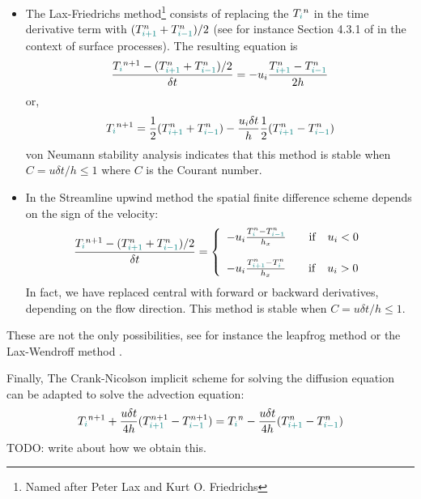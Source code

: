\begin{itemize}
\item The {\color{olive} Lax-Friedrichs method}\footnote{Named after Peter Lax 
and Kurt O. Friedrichs} consists of replacing the $T_{\color{teal}i}^n$ 
in the time derivative term with $(T_{{\color{teal}i+1}}^n + T_{{\color{teal}i-1}}^n)/2$
(see for instance Section 4.3.1 of \cite{pell08} in the context of surface processes). 
The resulting equation is
\[
\frac{T_{\color{teal}i}^{n+1}-  (T_{{\color{teal}i+1}}^n + T_{{\color{teal}i-1}}^n)/2 }{\delta t} 
= - u_i \frac{T^n_{{\color{teal}i+1}}-T^n_{{\color{teal}i-1}}}{2 h}
\]
or, 
\[
T_{\color{teal}i}^{n+1} = \frac{1}{2} (T_{{\color{teal}i+1}}^n + T_{{\color{teal}i-1}}^n)  
- \frac{u_i \delta t}{h}  \frac{1}{2} (T^n_{{\color{teal}i+1}}-T^n_{{\color{teal}i-1}})
\]
von Neumann stability analysis indicates that this method is stable
when $C=u \delta t/h \leq 1$ where $C$ is the Courant number.
\item In the {\color{olive}Streamline upwind} method the spatial finite difference scheme 
depends on the sign of the velocity:
\[
\frac{T_{\color{teal}i}^{n+1}-  (T_{{\color{teal}i+1}}^n + T_{{\color{teal}i-1}}^n)/2   }{\delta t} =
\left\{
\begin{array}{l}
 - u_i \frac{T^n_{{\color{teal}i}}-T^n_{{\color{teal}i-1}}}{h_x}  \quad\quad  {\rm if} \quad u_i<0\\ \\
 - u_i \frac{T^n_{{\color{teal}i+1}}-T^n_{{\color{teal}i}}}{h_x}  \quad\quad  {\rm if} \quad u_i>0
\end{array}
\right.
\]
In fact, we have replaced central with forward or backward derivatives, depending on the flow direction. 
This method is stable when $C=u \delta t/h \leq 1$. 
\end{itemize}
These are not the only possibilities, see for instance the {\color{olive} leapfrog method} or the 
{\color{olive} Lax-Wendroff method} \cite{hoch}.


Finally, The Crank-Nicolson implicit scheme for solving the diffusion equation 
can be adapted to solve the advection equation:
\[
T_{\color{teal}i}^{n+1} + \frac{u \delta t}{4h} (T_{{\color{teal}i+1}}^{n+1}-T_{{\color{teal}i-1}}^{n+1}) 
= T_{\color{teal}i}^n - \frac{u \delta t}{4h} (T_{{\color{teal}i+1}}^{n}-T_{{\color{teal}i-1}}^{n}) 
\]
TODO: write about how we obtain this.


